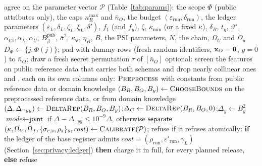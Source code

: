 
\algrenewcommand{}
\algrenewcommand{}

\begin{algorithm}[p]
\caption{\textsc{Setup} (Phase~0)}
\label{alg:setup}
\small
\begin{algorithmic}[1]
\State \Bdo agree on the parameter vector $\mathcal P$ (Table~\ref{tab:params}): the scope $\Phi$ (public attributes only), the caps $n_R^{\max}$ and $\bar n_O$, the budget $(\varepsilon_{\mathrm{run}},\delta_{\mathrm{run}})$, the ledger parameters $(\varepsilon_L,\delta_L,\zeta_L,\xi_L,\delta')$, $f_1$ (and $f_y$), $\zeta$, $\kappa_{\min}$ (or a fixed $\kappa$), $\delta_B$, $t_\eta$, $\vartheta^\star$, $\alpha_{\mathrm{CI}},\alpha_L,\alpha_U$, $B_\beta^{\mathrm{pub}}$, $\bar\sigma^2$, $\kappa_\Psi$, $\eta_B$, $B$, the PSI parameters, $N$, the chain, $\Omega_U$ and $\Omega_u$
\State \Odo $D_\Phi\gets\{j:\Phi(j)\}$; pad with dummy rows (fresh random identifiers, $\mathbf{x}_O=\mathbf 0$, $y=0$) to $\bar n_O$; draw a fresh secret permutation $\tau$ of $[\bar n_O]$
\State \Bdo optional: screen the features on public reference data that carries both schemas and drop nearly collinear ones 
\State \Rdo and \Odo, each on its own columns only: $\textsc{Preprocess}$ with constants from public reference data or domain knowledge
\State \Bdo $(B_R,B_O,B_y)\gets\textsc{ChooseBounds}$ on the preprocessed reference data, or from domain knowledge 
\State $(\Delta,\Delta_{\neg yy})\gets\textsc{DeltaRep}(B_R,B_O,B_y)$;\quad $\Delta_G\gets\textsc{DeltaRep}(B_R,B_O,0)$;\quad $\Delta_y\gets B_y^2$
\State $\textit{mode}\gets\textsf{joint}$ if $\Delta-\Delta_{\neg yy}\le10^{-9}\Delta$, otherwise $\textsf{separate}$ 
\State \Odo $(\kappa,\Omega_V,\Omega_f,\{\sigma_{c,s},\rho_s\}_s,\mathit{cost})\gets\textsc{Calibrate}(\mathcal P)$; refuse if it refuses 
\State \Odo atomically: \textbf{if} the ledger of the base register admits $\mathit{cost}=(\rho_{\mathrm{run}},\varepsilon'_{\mathrm{run}},\gamma_L)$ (Section~\ref{sec:privacy:ledger}) \textbf{then} charge it in full, for every planned release, \textbf{else} refuse 

\end{algorithmic}
\end{algorithm}
